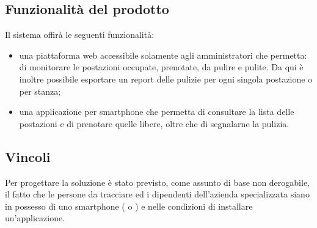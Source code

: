 \subsection{Funzionalit\`{a} del prodotto}
Il sistema \emph{\NomeProgetto} offir\`{a} le seguenti funzionalit\`{a}:
\begin{itemize}
    \item una piattaforma web accessibile solamente agli amministratori che permetta: di monitorare le postazioni occupate, prenotate, da pulire e pulite. Da qui \`{e} inoltre possibile esportare un report delle pulizie per ogni singola postazione o per stanza;
    \item una applicazione per smartphone che permetta di consultare la lista delle postazioni e di prenotare quelle libere, oltre che di segnalarne la pulizia.
\end{itemize}

\subsection{Vincoli}
Per progettare la soluzione è stato previsto, come assunto di base non derogabile, il fatto che le persone
da tracciare ed i dipendenti dell’azienda specializzata siano in possesso di uno smartphone ( o ) e nelle condizioni di installare un’applicazione.
